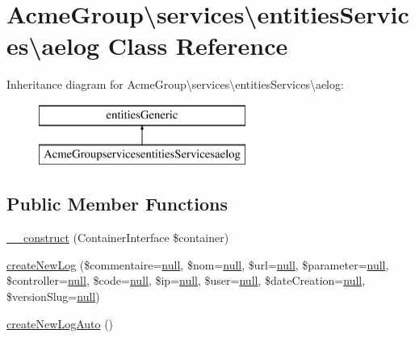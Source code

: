 \hypertarget{class_acme_group_1_1services_1_1entities_services_1_1aelog}{\section{Acme\+Group\textbackslash{}services\textbackslash{}entities\+Services\textbackslash{}aelog Class Reference}
\label{class_acme_group_1_1services_1_1entities_services_1_1aelog}
}
Inheritance diagram for Acme\+Group\textbackslash{}services\textbackslash{}entities\+Services\textbackslash{}aelog\+:\begin{figure}[H]
\begin{center}
\leavevmode
\includegraphics[height=2.000000cm]{class_acme_group_1_1services_1_1entities_services_1_1aelog}
\end{center}
\end{figure}
\subsection*{Public Member Functions}
\begin{DoxyCompactItemize}
\item 
\hyperlink{class_acme_group_1_1services_1_1entities_services_1_1aelog_aac522e9df2372a16b20c38c6d3ef4e2e}{\+\_\+\+\_\+construct} (Container\+Interface \$container)
\item 
\hyperlink{class_acme_group_1_1services_1_1entities_services_1_1aelog_aeed8a4f5919c7709eafbfddce8339ea8}{create\+New\+Log} (\$commentaire=\hyperlink{validate_8js_afb8e110345c45e74478894341ab6b28e}{null}, \$nom=\hyperlink{validate_8js_afb8e110345c45e74478894341ab6b28e}{null}, \$url=\hyperlink{validate_8js_afb8e110345c45e74478894341ab6b28e}{null}, \$parameter=\hyperlink{validate_8js_afb8e110345c45e74478894341ab6b28e}{null}, \$controller=\hyperlink{validate_8js_afb8e110345c45e74478894341ab6b28e}{null}, \$code=\hyperlink{validate_8js_afb8e110345c45e74478894341ab6b28e}{null}, \$ip=\hyperlink{validate_8js_afb8e110345c45e74478894341ab6b28e}{null}, \$user=\hyperlink{validate_8js_afb8e110345c45e74478894341ab6b28e}{null}, \$date\+Creation=\hyperlink{validate_8js_afb8e110345c45e74478894341ab6b28e}{null}, \$version\+Slug=\hyperlink{validate_8js_afb8e110345c45e74478894341ab6b28e}{null})
\item 
\hyperlink{class_acme_group_1_1services_1_1entities_services_1_1aelog_a878c05e8701e4721f639943d4a7c3bf4}{create\+New\+Log\+Auto} ()
\end{DoxyCompactItemize}
